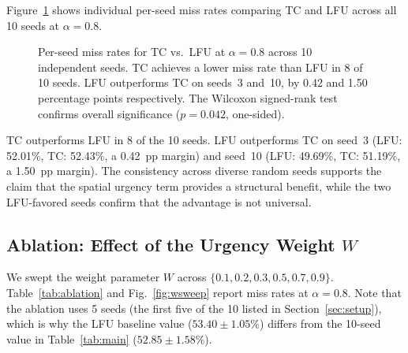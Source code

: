 \documentclass[preprint,12pt]{elsarticle}
\begin{document}
	Figure~\ref{fig:perseed} shows individual per-seed miss rates comparing TC and LFU across all 10 seeds at $\alpha = 0.8$.
	
	\begin{figure}[t]
		\centering
		\caption{Per-seed miss rates for TC vs.\ LFU at $\alpha=0.8$ across 10 independent seeds. TC achieves a lower miss rate than LFU in 8 of 10 seeds. LFU outperforms TC on seeds~3 and~10, by 0.42 and 1.50 percentage points respectively. The Wilcoxon signed-rank test confirms overall significance ($p=0.042$, one-sided).}
		\label{fig:perseed}
	\end{figure}
	
	TC outperforms LFU in 8 of the 10 seeds. LFU outperforms TC on seed~3 (LFU: 52.01\%, TC: 52.43\%, a 0.42~pp margin) and seed~10 (LFU: 49.69\%, TC: 51.19\%, a 1.50~pp margin). The consistency across diverse random seeds supports the claim that the spatial urgency term provides a structural benefit, while the two LFU-favored seeds confirm that the advantage is not universal.
	
	\subsection{Ablation: Effect of the Urgency Weight $W$}
	\label{sec:wsweep}
	
	We swept the weight parameter $W$ across $\{0.1, 0.2, 0.3, 0.5, 0.7, 0.9\}$. Table~\ref{tab:ablation} and Fig.~\ref{fig:wsweep} report miss rates at $\alpha=0.8$. Note that the ablation uses 5 seeds (the first five of the 10 listed in Section~\ref{sec:setup}), which is why the LFU baseline value ($53.40 \pm 1.05$\%) differs from the 10-seed value in Table~\ref{tab:main} ($52.85 \pm 1.58$\%).
	
\end{document}
